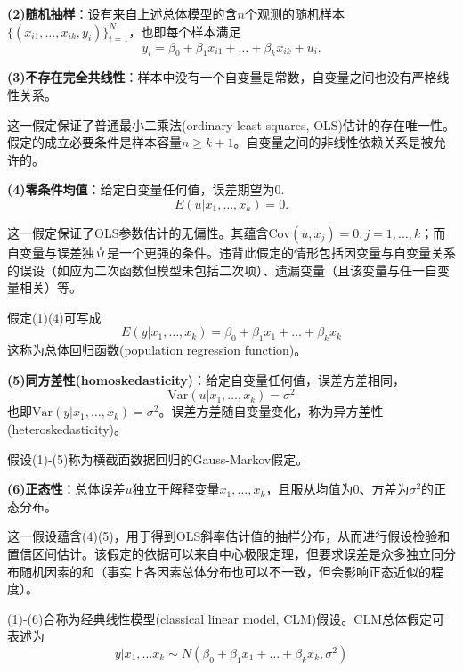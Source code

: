 \par \textbf{(2)随机抽样}：设有来自上述总体模型的含$n$个观测的随机样本$\{(x_{i1}, \dots, x_{ik}, y_i)\}_{i=1}^N$，也即每个样本满足
\begin{equation}
    y_i=\beta_0+\beta_1 x_{i1}+\dots+\beta_k x_{ik} +u_i.
\end{equation}

\par \textbf{(3)不存在完全共线性}：样本中没有一个自变量是常数，自变量之间也没有严格线性关系。
\par 这一假定保证了普通最小二乘法(ordinary least squares, OLS)估计的存在唯一性。假定的成立必要条件是样本容量$n\ge k+1$。自变量之间的非线性依赖关系是被允许的。

\par \textbf{(4)零条件均值}：给定自变量任何值，误差期望为0.
\begin{equation}
    E(u\vert x_1, \dots, x_k)=0.
\end{equation}
\par 这一假定保证了OLS参数估计的无偏性。其蕴含$\text{Cov}(u,x_j)=0, j=1,\dots,k$；而自变量与误差独立是一个更强的条件。违背此假定的情形包括因变量与自变量关系的误设（如应为二次函数但模型未包括二次项）、遗漏变量（且该变量与任一自变量相关）等。
\par 假定(1)(4)可写成
\begin{equation}
    E(y\vert x_1,\dots,x_k)=\beta_0+\beta_1 x_1+\dots+\beta_k x_k
\end{equation}
这称为总体回归函数(population regression function)。

\par \textbf{(5)同方差性(homoskedasticity)}：给定自变量任何值，误差方差相同，
\begin{equation}
    \text{Var}(u\vert x_1, \dots, x_k)=\sigma^2
\end{equation}
也即$\text{Var}(y\vert x_1, \dots, x_k)=\sigma^2$。误差方差随自变量变化，称为异方差性(heteroskedasticity)。
\par 假设(1)-(5)称为横截面数据回归的Gauss-Markov假定。

\par \textbf{(6)正态性}：总体误差$u$独立于解释变量$x_1,\dots,x_k$，且服从均值为0、方差为$\sigma^2$的正态分布。
\par 这一假设蕴含(4)(5)，用于得到OLS斜率估计值的抽样分布，从而进行假设检验和置信区间估计。该假定的依据可以来自中心极限定理，但要求误差是众多独立同分布随机因素的和（事实上各因素总体分布也可以不一致，但会影响正态近似的程度）。

\par (1)-(6)合称为经典线性模型(classical linear model, CLM)假设。CLM总体假定可表述为
\begin{equation}
    y\vert x_1,\dots x_k \sim N(\beta_0+\beta_1x_1+\dots+\beta_kx_k,\sigma^2)
\end{equation}

